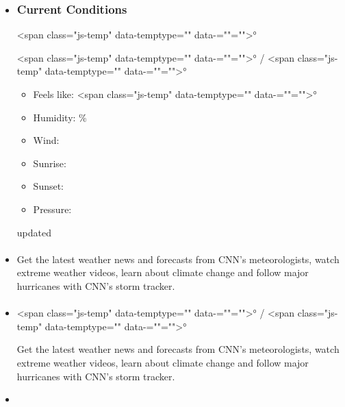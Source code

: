 \begin{itemize}
\item
  \hypertarget{current-conditions}{%
  \subsubsection{Current Conditions}\label{current-conditions}}

  \textless span class="js-temp" data-temptype=""
  data-=""=""\textgreater{}°

  \textless span class="js-temp" data-temptype=""
  data-=""=""\textgreater{}° / \textless span class="js-temp"
  data-temptype="" data-=""=""\textgreater{}°

  \begin{itemize}
  \tightlist
  \item
    Feels like: \textless span class="js-temp" data-temptype=""
    data-=""=""\textgreater{}°
  \item
    Humidity: \%
  \item
    Wind: 
  \item
    Sunrise: 
  \item
    Sunset: 
  \item
    Pressure: 
  \end{itemize}

  updated
\item
  \hypertarget{section}{%
  \paragraph{}\label{section}}

  Get the latest weather news and forecasts from CNN's meteorologists,
  watch extreme weather videos, learn about climate change and follow
  major hurricanes with CNN's storm tracker.
\item
  \hypertarget{section-1}{%
  \paragraph{}\label{section-1}}

  \textless span class="js-temp" data-temptype=""
  data-=""=""\textgreater{}° / \textless span class="js-temp"
  data-temptype="" data-=""=""\textgreater{}°

  Get the latest weather news and forecasts from CNN's meteorologists,
  watch extreme weather videos, learn about climate change and follow
  major hurricanes with CNN's storm tracker.
\item
  \hypertarget{section-2}{%
}
\end{itemize}
